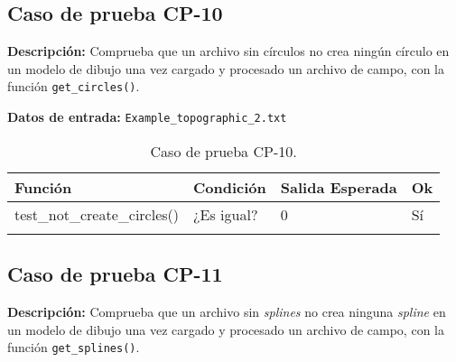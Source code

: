 \subsection{Caso de prueba CP-10}

\textbf{Descripción:} Comprueba que un archivo sin círculos no crea ningún círculo en un modelo de dibujo una vez cargado y procesado un archivo de campo, con la función \texttt{get\_circles()}.

\textbf{Datos de entrada:} \texttt{Example\_topographic\_2.txt}


\begin{longtable}[]{@{}llll@{}}
\toprule
\begin{minipage}[b]{0.6\columnwidth}\raggedright\strut
Función\strut
\end{minipage} & \begin{minipage}[b]{0.20\columnwidth}\raggedright\strut
Condición\strut
\end{minipage} & \begin{minipage}[b]{0.15\columnwidth}\raggedright\strut
Salida Esperada\strut
\end{minipage} & \begin{minipage}[b]{0.05\columnwidth}\raggedright\strut
Ok\strut
\end{minipage}\tabularnewline
\midrule
\endhead
\begin{minipage}[t]{0.6\columnwidth}\raggedright\strut
\small{test\_not\_create\_circles()}\strut
\end{minipage} & \begin{minipage}[t]{0.20\columnwidth}\raggedright\strut
¿Es igual?\strut
\end{minipage} & \begin{minipage}[t]{0.15\columnwidth}\raggedright\strut
0\strut
\end{minipage} & \begin{minipage}[t]{0.05\columnwidth}\raggedright\strut
Sí\strut
\end{minipage}\tabularnewline

\bottomrule
\caption{Caso de prueba CP-10.}
\end{longtable}

\subsection{Caso de prueba CP-11}

\textbf{Descripción:} Comprueba que un archivo sin \emph{splines} no crea ninguna \emph{spline} en un modelo de dibujo una vez cargado y procesado un archivo de campo, con la función \texttt{get\_splines()}.

